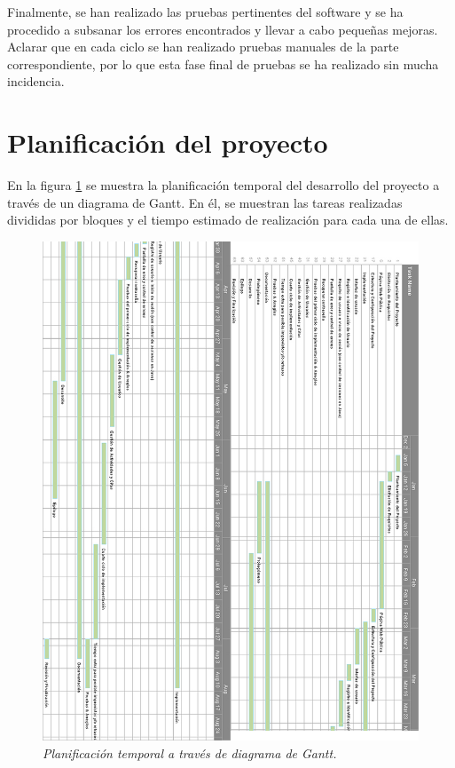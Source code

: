 Finalmente, se han realizado las pruebas pertinentes del software y se ha procedido a subsanar los errores encontrados y llevar a cabo pequeñas mejoras. Aclarar que en cada ciclo se han realizado pruebas manuales de la parte correspondiente, por lo que esta fase final de pruebas se ha realizado sin mucha incidencia.


\section{Planificación del proyecto}

En la figura \ref{fig:diagrama-gantt} se muestra la planificación temporal del desarrollo del proyecto a través de un diagrama de Gantt. En él, se muestran las tareas realizadas divididas por bloques y el tiempo estimado de realización para cada una de ellas. \\

\begin{figure}
\centering
  \includegraphics[scale=.50]{img/diagrama-Gantt.jpg}
  \caption{\textit{Planificación temporal a través de diagrama de Gantt.}}
  \label{fig:diagrama-gantt}
\end{figure}

